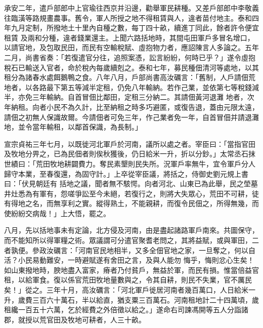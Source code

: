 \begin{pinyinscope}
 承安二年，遣戶部郎中上官瑜往西京并沿邊，勸舉軍民耕種。又差戶部郎中李敬義往臨潢等路規畫農事。舊令，軍人所授之地不得租賃與人，違者苗付地主。泰和四年九月定制，所撥地土十里內自種之數，每丁四十畝，續進丁同此，餘者許令便宜租賃
 及兩和分種，違者錢業還主。上聞六路括地時，其間屯田軍戶多冒名增口，以請官地，及包取民田，而民有空輸稅賦、虛抱物力者，應詔陳言人多論之。五年二月，尚書省奏：「若復遣官分往，追照案憑，訟言紛紛，何時已乎？」遂令虛抱稅石已輸送入官者，命於稅內每歲續剋之。泰和七年，募民種佃清河等處地，以其租分為諸春水處餌鵝鴨之食。八年八月，戶部尚書高汝礪言：「舊制，人戶請佃荒地者，以各路最下第五等減半定租，仍免八年輸納。若作己業，並依第七等稅錢減半，亦免三年輸納。自首冒佃比鄰田，定租三分納二。其請佃黃河退灘
 地者，次年納租。向者小民不為久計，比至納租之時多巧避匿，或復告退，蓋由元限太遠，請佃之初無人保識故爾。今請佃者可免三年，作己業者免一年，自首冒佃并請退灘地，並令當年輸租，以鄰首保識，為長制。」



 宣宗貞祐三年七月，以既徙河北軍戶於河南，議所以處之者。宰臣曰：「當指官田及牧地分畀之，已為民佃者則俟秋獲後，仍日給米一升，折以分鈔。」太常丞石抹世績曰：「荒田牧地耕闢費力。奪民素墾則民失所。況軍戶率無牛，宜令軍戶分人歸守本業，至春復還，為固守計。」上卒從宰臣議，將括之，侍御史劉元規上書曰：「伏見朝廷有
 括地之議，聞者無不駭愕。向者河北、山東已為此舉，民之塋墓井灶悉為有軍有，怨嗟爭訟至今未絕，若復行之，則將大失眾心，荒田不可耕，徒有得地之名，而無享利之實。縱得熟土，不能親耕，而復令民佃之，所得無幾，而使紛紛交病哉！」上大悟，罷之。



 八月，先以括地事未有定論，北方侵及河南，由是盡起諸路軍戶南來。共圖保守，而不能知所以得軍糧之術。眾議謂可分遣官聚耆老問之，其將益賦，或與軍田，二者孰便。參政汝礪言：「河南官民地相半，又多全佃官地之家，一旦奪之，何以自活？小民易動難安，一時避賦遂有舍田之言，及與人能勿
 悔乎，悔則忿心生矣！如山東撥地時，腴地盡入富家，瘠者乃付貧戶，無益於軍，而民有損。惟當倍益官租，以給軍食。復以係官荒田牧地量數與之，令其自耕，則民不失業，官不厲民矣！」從之。三年十月，高汝礪言：「河北軍戶徙居河南者幾百萬口，人日給米一升，歲費三百六十萬石，半以給直，猶支粟三百萬石。河南租地計二十四萬頃，歲租纔一百五十六萬，乞於經費之外倍徵以給之。」遂命右司諫馮開等五人分詣諸郡，就授以荒官田及牧地可耕者，人三十畝。




\end{pinyinscope}
